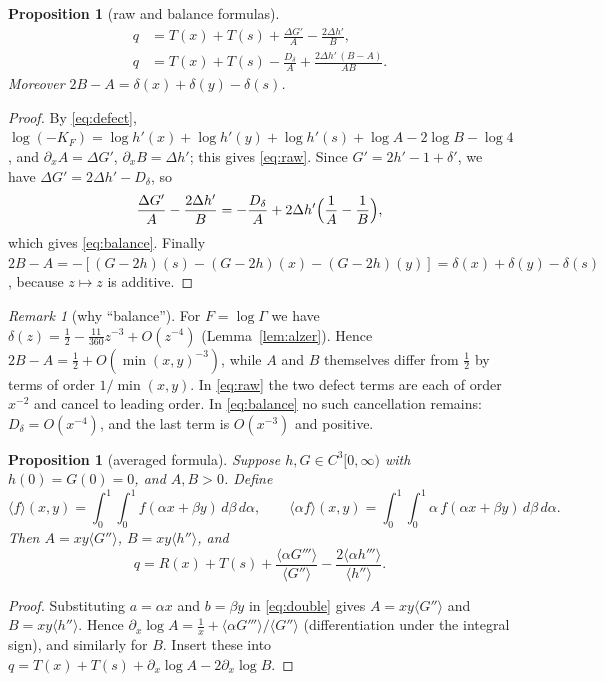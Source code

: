 \documentclass[11pt,a4paper]{article}
\newtheorem{proposition}[theorem]{Proposition}
\theoremstyle{definition}
\theoremstyle{remark}
\newtheorem{remark}[theorem]{Remark}
\newcommand{\av}[1]{\langle #1\rangle}
\newcommand{\Dd}{D_\delta}
\begin{document}
\begin{proposition}[raw and balance formulas]\label{prop:raw}
\begin{align}
q&=T(x)+T(s)+\frac{\Delta G'}{A}-\frac{2\Delta h'}{B},\label{eq:raw}\\
q&=T(x)+T(s)-\frac{\Dd}{A}+\frac{2\Delta h'\,(B-A)}{AB}.\label{eq:balance}
\end{align}
Moreover $2B-A=\delta(x)+\delta(y)-\delta(s)$.
\end{proposition}
\begin{proof}
By \eqref{eq:defect}, $\log(-K_F)=\log h'(x)+\log h'(y)+\log h'(s)+\log A-2\log B-\log4$, and $\partial_xA=\Delta G'$, $\partial_xB=\Delta h'$; this gives \eqref{eq:raw}. Since $G'=2h'-1+\delta'$, we have $\Delta G'=2\Delta h'-\Dd$, so
\[
\frac{\Delta G'}{A}-\frac{2\Delta h'}{B}=-\frac{\Dd}{A}+2\Delta h'\Bigl(\frac1A-\frac1B\Bigr),
\]
which gives \eqref{eq:balance}. Finally $2B-A=-[(G-2h)(s)-(G-2h)(x)-(G-2h)(y)]=\delta(x)+\delta(y)-\delta(s)$, because $z\mapsto z$ is additive.
\end{proof}

\begin{remark}[why ``balance'']\label{rem:balance}
For $F=\log\Gamma$ we have $\delta(z)=\frac12-\frac{11}{360}z^{-3}+O(z^{-4})$ (Lemma~\ref{lem:alzer}). Hence $2B-A=\frac12+O(\min(x,y)^{-3})$, while $A$ and $B$ themselves differ from $\frac12$ by terms of order $1/\min(x,y)$. In \eqref{eq:raw} the two defect terms are each of order $x^{-2}$ and cancel to leading order. In \eqref{eq:balance} no such cancellation remains: $\Dd=O(x^{-4})$, and the last term is $O(x^{-3})$ and positive.
\end{remark}

\begin{proposition}[averaged formula]\label{prop:avg}
Suppose $h,G\in C^3[0,\infty)$ with $h(0)=G(0)=0$, and $A,B>0$. Define
\[
\av{f}(x,y)=\int_0^1\!\!\int_0^1 f(\alpha x+\beta y)\,d\beta\,d\alpha,\qquad \av{\alpha f}(x,y)=\int_0^1\!\!\int_0^1 \alpha\, f(\alpha x+\beta y)\,d\beta\,d\alpha .
\]
Then $A=xy\av{G''}$, $B=xy\av{h''}$, and
\begin{equation}\label{eq:avg}
q=R(x)+T(s)+\frac{\av{\alpha G'''}}{\av{G''}}-\frac{2\av{\alpha h'''}}{\av{h''}} .
\end{equation}
\end{proposition}
\begin{proof}
Substituting $a=\alpha x$ and $b=\beta y$ in \eqref{eq:double} gives $A=xy\av{G''}$ and $B=xy\av{h''}$. Hence $\partial_x\log A=\frac1x+\av{\alpha G'''}/\av{G''}$ (differentiation under the integral sign), and similarly for $B$. Insert these into $q=T(x)+T(s)+\partial_x\log A-2\partial_x\log B$.
\end{proof}
\end{document}

